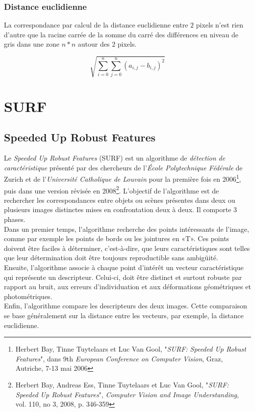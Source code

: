 \documentclass[a4paper,12pt]{report}
\begin{document}
\subsubsection{Distance euclidienne}
La correspondance par calcul de la distance euclidienne entre $2$ pixels n'est rien d'autre que la racine carrée de la somme du carré des différences en niveau de gris dans une zone $n*n$ autour des $2$ pixels.

$$ \sqrt{\sum_{i=0}^{n}\sum_{j=0}^{n}(a_{i,j} - b_{i,j})^2} $$


\pagebreak
\section{SURF}

\subsection{Speeded Up Robust Features}
Le \textit{Speeded Up Robust Features} (SURF) est un algorithme de \textit{détection de caractéristique} présenté par des chercheurs de l'\textit{\'Ecole Polytechnique Fédérale} de Zurich et de l'\textit{Université Catholique de Louvain} pour la première fois en 2006\footnote{Herbert Bay, Tinne Tuytelaars et Luc Van Gool, "\textit{SURF: Speeded Up Robust Features}", dans 9th \textit{European Conference on Computer Vision}, Graz, Autriche, 7-13 mai 2006}, puis dans une version révisée en 2008\footnote{Herbert Bay, Andreas Ess, Tinne Tuytelaars et Luc Van Gool, "\textit{SURF: Speeded Up Robust Features}", \textit{Computer Vision and Image Understanding}, vol. 110, no 3, 2008, p. 346-359}.
L'objectif de l'algorithme est de rechercher les correspondances entre objets ou scènes présentes dans deux ou plusieurs images distinctes mises en confrontation deux à deux. Il comporte 3 phases. 
\\Dans un premier temps, l'algorithme recherche des points intéressants de l'image, comme par exemple les points de bords ou les jointures en «T». Ces points doivent être faciles à déterminer, c'est-à-dire, que leurs caractéristiques sont telles que leur détermination doit être toujours reproductible sans ambigüité. \\ 
Ensuite, l'algorithme associe à chaque point d'intérêt un vecteur caractéristique qui représente un descripteur. Celui-ci, doit être distinct et surtout robuste par rapport au bruit, aux erreurs d'individuation et aux déformations géométriques et photométriques. \\
Enfin,  l'algorithme compare les descripteurs des deux images. Cette comparaison se base généralement sur la distance entre les vecteurs, par exemple, la distance euclidienne.
\end{document}
